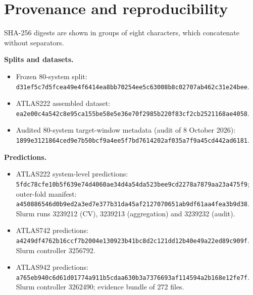 \documentclass[11pt]{article}
\begin{document}



\appendix
\section{Provenance and reproducibility}\label{app:provenance}
\small\sloppy

SHA-256 digests are shown in groups of eight characters, which concatenate without separators.

\textbf{Splits and datasets.}
\begin{itemize}
\item Frozen 80-system split: \texttt{d31ef5c7\allowbreak d5fcea49\allowbreak e4f6414e\allowbreak a8bb7025\allowbreak 4ee5c630\allowbreak 08b8c027\allowbreak 07ab462c\allowbreak 31e24bee}.
\item ATLAS222 assembled dataset: \texttt{ea2e00c4\allowbreak a542c8e9\allowbreak 5ca155be\allowbreak 58e5e36e\allowbreak 70f2985b\allowbreak 220f83cf\allowbreak 2cb25211\allowbreak 68ae4058}.
\item Audited 80-system target-window metadata (audit of 8 October 2026): \texttt{1899e312\allowbreak 1864ced9\allowbreak e7b50bcf\allowbreak 9a4ee5f7\allowbreak bd761420\allowbreak 2af035a7\allowbreak f9a45cd4\allowbreak 42ad6181}.
\end{itemize}

\textbf{Predictions.}
\begin{itemize}
\item ATLAS222 system-level predictions: \texttt{5fdc78cf\allowbreak e10b5f63\allowbreak 9e74d406\allowbreak 0ae34d4a\allowbreak 54da523b\allowbreak ee9cd227\allowbreak 8a7879aa\allowbreak 23a475f9}; outer-fold manifest: \texttt{a4508865\allowbreak 46d0b9ed\allowbreak 2a3ed7e3\allowbreak 77b31da4\allowbreak 5af21270\allowbreak 70651ab9\allowbreak df61aa4f\allowbreak ea3b9d38}. Slurm runs 3239212 (CV), 3239213 (aggregation) and 3239232 (audit).
\item ATLAS742 predictions: \texttt{a4249df4\allowbreak 762b16cc\allowbreak f7b2004e\allowbreak 130923b4\allowbreak 1bc8d2c1\allowbreak 21dd12b4\allowbreak 0e49a22e\allowbreak d89c909f}. Slurm controller 3256792.
\item ATLAS942 predictions: \texttt{a765eb94\allowbreak 0c6d61d0\allowbreak 1774a911\allowbreak b5cdaa63\allowbreak 0b3a7376\allowbreak 693af114\allowbreak 594a2b16\allowbreak 8e12fe7f}. Slurm controller 3262490; evidence bundle of 272 files.
\end{itemize}
\end{document}
